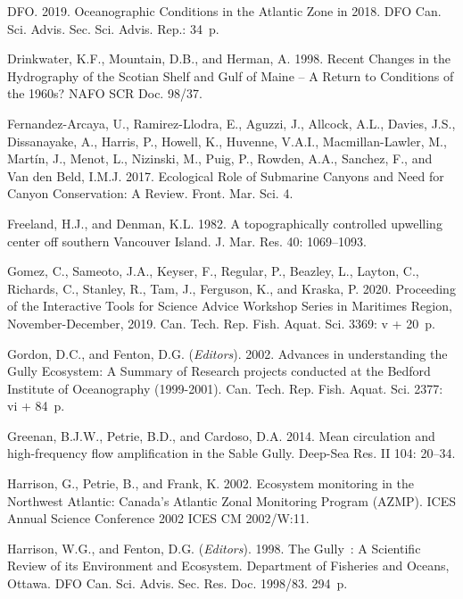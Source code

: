 \documentclass[12pt]{article}\usepackage[]{graphicx}\usepackage[]{color}
\begin{document}
\begin{CSLReferences}{1}{0}
%
DFO. 2019. {Oceanographic Conditions in the Atlantic Zone in 2018}. DFO Can. Sci. Advis. Sec. Sci. Advis. Rep.: 34~p.

%
Drinkwater, K.F., Mountain, D.B., and Herman, A. 1998. {Recent Changes in the Hydrography of the Scotian Shelf and Gulf of Maine -- A Return to Conditions of the 1960s?} NAFO SCR Doc. 98/37.

%
Fernandez-Arcaya, U., Ramirez-Llodra, E., Aguzzi, J., Allcock, A.L., Davies, J.S., Dissanayake, A., Harris, P., Howell, K., Huvenne, V.A.I., Macmillan-Lawler, M., Martín, J., Menot, L., Nizinski, M., Puig, P., Rowden, A.A., Sanchez, F., and Van den Beld, I.M.J. 2017. {Ecological Role of Submarine Canyons and Need for Canyon Conservation: A Review}. Front. Mar. Sci. 4.

%
Freeland, H.J., and Denman, K.L. 1982. A {topographically} {controlled} {upwelling} {center} {off} {southern} {Vancouver} {Island}. J. Mar. Res. 40: 1069--1093.

%
Gomez, C., Sameoto, J.A., Keyser, F., Regular, P., Beazley, L., Layton, C., Richards, C., Stanley, R., Tam, J., Ferguson, K., and Kraska, P. 2020. {Proceeding of the Interactive Tools for Science Advice Workshop Series in Maritimes Region, November-December, 2019.} Can. Tech. Rep. Fish. Aquat. Sci. 3369: v + 20~p.

%
Gordon, D.C., and Fenton, D.G. (\emph{Editors}). 2002. Advances in understanding the {Gully} {Ecosystem}: A {Summary} of {Research} projects conducted at the {Bedford Institute of Oceanography} (1999-2001). Can. Tech. Rep. Fish. Aquat. Sci. 2377: vi + 84~p.

%
Greenan, B.J.W., Petrie, B.D., and Cardoso, D.A. 2014. {Mean circulation and high-frequency flow amplification in the Sable Gully}. Deep-Sea Res. II 104: 20--34.

%
Harrison, G., Petrie, B., and Frank, K. 2002. {Ecosystem monitoring in the Northwest Atlantic: Canada's Atlantic Zonal Monitoring Program (AZMP)}. ICES Annual Science Conference 2002 ICES CM 2002/W:11.

%
Harrison, W.G., and Fenton, D.G. (\emph{Editors}). 1998. {The Gully~: A Scientific Review of its Environment and Ecosystem}. Department of Fisheries and Oceans, Ottawa. DFO Can. Sci. Advis. Sec. Res. Doc. 1998/83. 294~p.


\end{CSLReferences}
\end{document}
